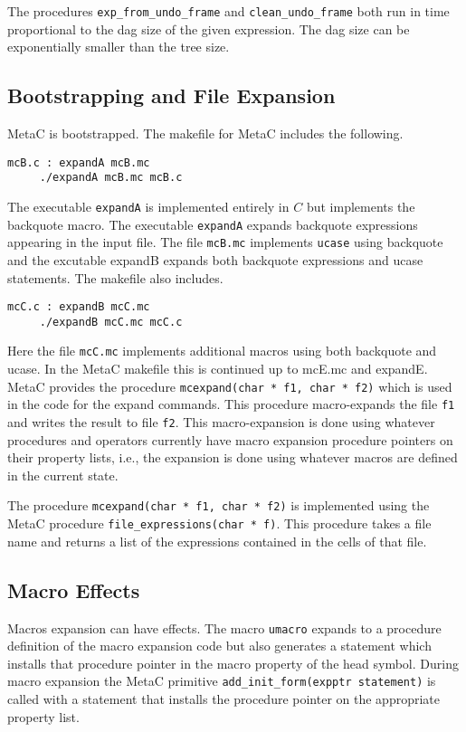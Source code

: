 \documentclass{article}
\begin{document}
The procedures {\tt exp\_from\_undo\_frame} and {\tt clean\_undo\_frame} both run in time proportional to the dag size of the
given expression. The dag size can be exponentially smaller than the tree size.

\subsection{Bootstrapping and File Expansion}
\label{sec:bootstrap}

MetaC is bootstrapped.  The makefile for MetaC includes the following.
\begin{verbatim}
mcB.c : expandA mcB.mc
	 ./expandA mcB.mc mcB.c
\end{verbatim}
The executable {\tt expandA} is implemented entirely in $C$ but implements the backquote macro.  The executable {\tt expandA}
expands backquote expressions appearing in the input file. The file {\tt mcB.mc} implements {\tt ucase} using backquote
and the excutable expandB expands both backquote expressions and ucase statements.
The makefile also includes.
\begin{verbatim}
mcC.c : expandB mcC.mc
	 ./expandB mcC.mc mcC.c
\end{verbatim}
Here the file {\tt mcC.mc} implements additional macros using both backquote and ucase.  In the MetaC makefile this is continued up to mcE.mc and expandE.
MetaC provides the procedure
{\tt mcexpand(char * f1, char * f2)} which is used in the code for the expand commands.  This procedure macro-expands the
file {\tt f1} and writes the result to file {\tt f2}.  This macro-expansion is done using whatever procedures and operators currently
have macro expansion procedure pointers on their property lists, i.e., the expansion is done using whatever macros are defined in the current state.

The procedure {\tt mcexpand(char * f1, char * f2)} is implemented using the MetaC procedure {\tt file\_expressions(char * f)}.
This procedure takes a file name and returns a list of the expressions contained in the cells of that file.

\subsection{Macro Effects}

Macros expansion can have effects.  The macro {\tt umacro} expands to a procedure definition of the macro expansion code but also
generates a statement which installs that procedure pointer in the macro property of the head symbol.  During macro expansion the
MetaC primitive {\tt add\_init\_form(expptr statement)} is called with a statement that installs the procedure pointer on the appropriate property list.
\end{document}
